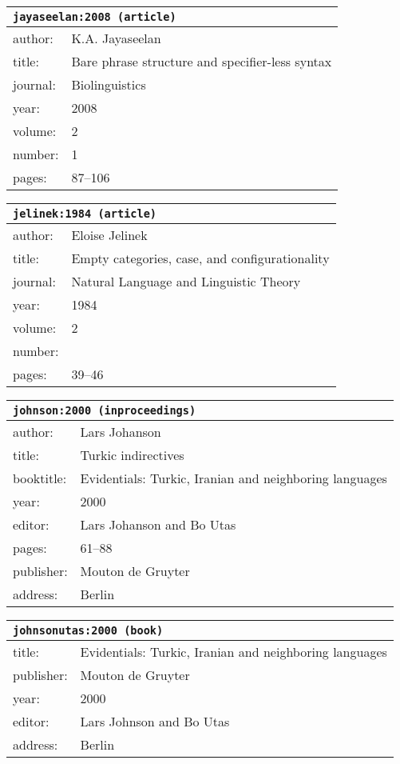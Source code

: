 \documentclass{article}
\begin{document}
\bigskip

\begin{tabular}{p{}p{}}
\multicolumn{2}{l}{\texttt{jayaseelan:2008 (article)}}\\
\hline
author: & K.A. Jayaseelan\\
title: & Bare phrase structure and specifier-less syntax\\
journal: & Biolinguistics\\
year: & 2008\\
volume: & 2\\
number: & 1\\
pages: & 87--106\\
\end{tabular}

\bigskip

\begin{tabular}{p{}p{}}
\multicolumn{2}{l}{\texttt{jelinek:1984 (article)}}\\
\hline
author: & Eloise Jelinek\\
title: & Empty categories, case, and configurationality\\
journal: & Natural Language and Linguistic Theory\\
year: & 1984\\
volume: & 2\\
number: & \\
pages: & 39--46\\
\end{tabular}

\bigskip

\begin{tabular}{p{}p{}}
\multicolumn{2}{l}{\texttt{johnson:2000 (inproceedings)}}\\
\hline
author: & Lars Johanson\\
title: & Turkic indirectives\\
booktitle: & Evidentials: Turkic, Iranian and neighboring languages\\
year: & 2000\\
editor: & Lars Johanson and Bo Utas\\
pages: & 61--88\\
publisher: & Mouton de Gruyter\\
address: & Berlin\\
\end{tabular}

\bigskip

\begin{tabular}{p{}p{}}
\multicolumn{2}{l}{\texttt{johnsonutas:2000 (book)}}\\
\hline
title: & Evidentials: Turkic, Iranian and neighboring languages\\
publisher: & Mouton de Gruyter\\
year: & 2000\\
editor: & Lars Johnson and Bo Utas\\
address: & Berlin\\
\end{tabular}
\end{document}
